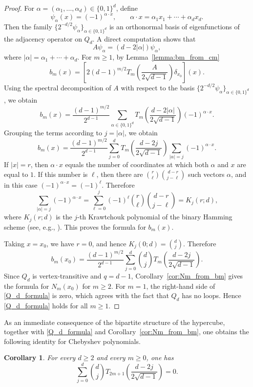 \documentclass[reqno,10pt]{amsart}
\newtheorem{corollary}[theorem]{Corollary}
\theoremstyle{definition}
\numberwithin{equation}{section}
\begin{document}
\begin{proof}
For
$\alpha=(\alpha_1,\ldots,\alpha_d)\in\{0,1\}^d$, define
\[
\psi_\alpha(x)=(-1)^{\alpha\cdot x},
\qquad
\alpha\cdot x=\alpha_1x_1+\cdots+\alpha_dx_d .
\]
Then the family $\{2^{-d/2}\psi_\alpha\}_{\alpha\in\{0,1\}^d}$ is an orthonormal basis of eigenfunctions of the adjacency operator on
$Q_d$. A direct computation shows that
\[
A\psi_\alpha=(d-2|\alpha|)\psi_\alpha,
\]
where $|\alpha|=\alpha_1+\cdots+\alpha_d$.
For $m\ge1$, by Lemma~\ref{lemma:bm_from_cm}
\[
b_m(x)
=
\left[
2(d-1)^{m/2}
T_m\!\left(\frac{A}{2\sqrt{d-1}}\right)\delta_{x_0}
\right](x).
\]
Using the spectral decomposition of $A$ with respect to the basis
$\{2^{-d/2}\psi_\alpha\}_{\alpha\in\{0,1\}^d}$, we obtain
\[
b_m(x)
=
\frac{(d-1)^{m/2}}{2^{d-1}}
\sum_{\alpha\in\{0,1\}^d}
T_m\!\left(
\frac{d-2|\alpha|}{2\sqrt{d-1}}
\right)
(-1)^{\alpha\cdot x}.
\]
Grouping the terms according to $j=|\alpha|$, we obtain
\[
b_m(x)
=
\frac{(d-1)^{m/2}}{2^{d-1}}
\sum_{j=0}^{d}
T_m\!\left(
\frac{d-2j}{2\sqrt{d-1}}
\right)
\sum_{|\alpha|=j}
(-1)^{\alpha\cdot x}.
\]
If $|x|=r$, then $\alpha\cdot x$ equals the number of
coordinates at which both $\alpha$ and $x$ are equal to $1$.
If this number is $\ell$, then there are
$\binom r\ell \binom{d-r}{j-\ell}$ such vectors $\alpha$, and in this case $(-1)^{\alpha\cdot x}=(-1)^\ell$. Therefore
\[
\sum_{|\alpha|=j}
(-1)^{\alpha\cdot x}
=
\sum_{\ell=0}^{j}
(-1)^\ell
\binom{r}{\ell}
\binom{d-r}{j-\ell}
=
K_j(r;d),
\] 
where $K_j(r;d)$ is the $j$-th Krawtchouk polynomial of the binary Hamming scheme (see, e.g., \cite[Section 3.2]{BI84}). This proves the formula for $b_m(x)$.

Taking $x=x_0$, we have $r=0$, and hence $K_j(0;d)=\binom{d}{j}$. 
Therefore
\[
b_m(x_0)
=
\frac{(d-1)^{m/2}}{2^{d-1}}
\sum_{j=0}^{d}
\binom{d}{j}
T_m\!\left(
\frac{d-2j}{2\sqrt{d-1}}
\right).
\]
Since $Q_d$ is vertex-transitive and $q=d-1$, Corollary~\ref{cor:Nm_from_bm}
gives the formula for $N_m(x_0)$ for $m\ge2$. For $m=1$, the right-hand
side of \eqref{Q_d_formula} is zero, which agrees with the fact that $Q_d$
has no loops. Hence \eqref{Q_d_formula} holds for all $m\ge1$.
\end{proof}

As an immediate consequence of the bipartite structure of the hypercube,
together with \eqref{Q_d_formula} and Corollary~\ref{cor:Nm_from_bm}, one obtains the following identity for Chebyshev polynomials.

\begin{corollary}
For every $d\ge2$ and every $m\ge0$, one has
\[
\sum_{j=0}^{d}
\binom{d}{j}
T_{2m+1}\!\left(
\frac{d-2j}{2\sqrt{d-1}}
\right)
=0.
\]
\end{corollary}
\end{document}
